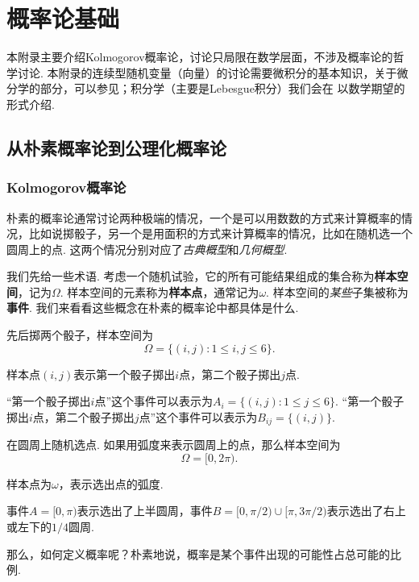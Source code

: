 \chapter{概率论基础}\label{chap:prob}

本附录主要介绍Kolmogorov概率论，讨论只局限在数学层面，不涉及概率论的哲学讨论. 本附录的连续型随机变量（向量）的讨论需要微积分的基本知识，关于微分学的部分，可以参见；积分学（主要是Lebesgue积分）我们会在 以数学期望的形式介绍. 

\section{从朴素概率论到公理化概率论}

\subsection{Kolmogorov概率论}\label{subsec:kolmogorov-probability}
朴素的概率论通常讨论两种极端的情况，一个是可以用数数的方式来计算概率的情况，比如说掷骰子，另一个是用面积的方式来计算概率的情况，比如在随机选一个圆周上的点. 这两个情况分别对应了\emph{古典概型}和\emph{几何概型}. 

我们先给一些术语. 考虑一个随机试验，它的所有可能结果组成的集合称为\textbf{样本空间}，记为$\Omega$. 样本空间的元素称为\textbf{样本点}，通常记为$\omega$. 样本空间的\emph{某些}子集被称为\textbf{事件}. 我们来看看这些概念在朴素的概率论中都具体是什么. 

\begin{example}[古典概型]
先后掷两个骰子，样本空间为
\[
    \Omega = \{ (i, j): 1 \leq i, j \leq 6 \}.
\]

样本点$(i, j)$表示第一个骰子掷出$i$点，第二个骰子掷出$j$点. 

“第一个骰子掷出$i$点”这个事件可以表示为$A_i = \{ (i, j): 1 \leq j \leq 6 \}$. “第一个骰子掷出$i$点，第二个骰子掷出$j$点”这个事件可以表示为$B_{ij} = \{ (i, j) \}$.
\end{example}

\begin{example}[几何概型]
在圆周上随机选点. 如果用弧度来表示圆周上的点，那么样本空间为
\[
    \Omega = [0, 2\pi).
\]

样本点为$\omega$，表示选出点的弧度. 

事件$A = [0, \pi)$表示选出了上半圆周，事件$B = [0, \pi/2)\cup[\pi, 3\pi/2)$表示选出了右上或左下的$1/4$圆周. 
\end{example}

那么，如何定义概率呢？朴素地说，概率是某个事件出现的可能性占总可能的比例. 

